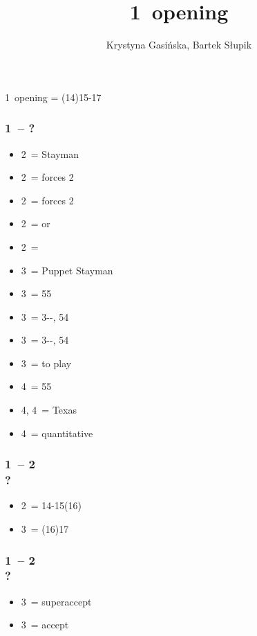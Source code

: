\documentclass[12pt, a4paper]{article}
\title{1\ntx\ opening}
\author{Krystyna Gasińska, Bartek Słupik}
\begin{document}
\maketitle


1\nt\ opening = (14)15-17 \bal

\subsubsection*{1\ntx\ -- ?}
\begin{itemize}
    \item 2\clubs\ = Stayman
    \item 2\diams\ = forces 2\hearts
    \item 2\hearts\ = forces 2\spades
    \item 2\spades\ = \inv or \trsf{\clubs}
    \item 2\nt\ = \trsf{\diams}
    \item 3\clubs\ = Puppet Stayman
    \item 3\diams\ = 55\minor
    \item 3\hearts\ = 3--\hearts, 54\minor
    \item 3\spades\ = 3--\spades, 54\minor
    \item 3\nt\ = to play
    \item 4\clubs\ = 55\major
    \item 4\diams, 4\hearts\ = Texas
    \item 4\nt\ = quantitative
\end{itemize}

\subsubsection*{1\ntx\ -- 2\spades \\ ?}
\begin{itemize}
    \item 2\nt\ = 14-15(16)
    \item 3\clubs\ = (16)17
\end{itemize}

\subsubsection*{1\ntx\ -- 2\ntx \\ ?}
\begin{itemize}
    \item 3\clubs\ = superaccept
    \item 3\diams\ = accept
\end{itemize}
\end{document}
